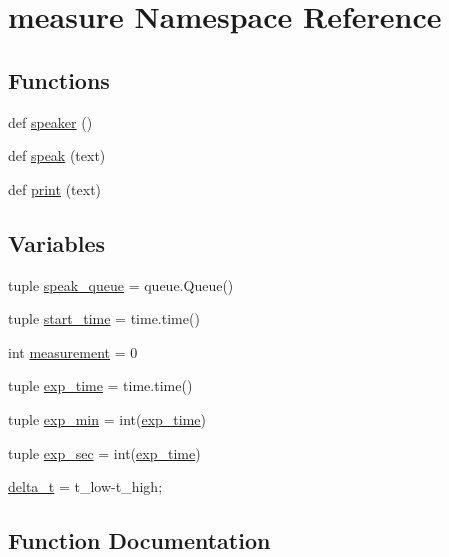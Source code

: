 \hypertarget{namespacemeasure}{}\section{measure Namespace Reference}
\label{namespacemeasure}
\subsection*{Functions}
\begin{DoxyCompactItemize}
\item 
def \hyperlink{namespacemeasure_a06a8470d68cd473205f1104a8a92b900}{speaker} ()
\item 
def \hyperlink{namespacemeasure_aee10fcc5094bce5022e1c6d65d4d0a62}{speak} (text)
\item 
def \hyperlink{namespacemeasure_a82ecbc4d07f744db6ad6c674647cb75f}{print} (text)
\end{DoxyCompactItemize}
\subsection*{Variables}
\begin{DoxyCompactItemize}
\item 
tuple \hyperlink{namespacemeasure_af323a7d2fced20a22d77d5ca33a02deb}{speak\+\_\+queue} = queue.\+Queue()
\item 
tuple \hyperlink{namespacemeasure_a5b970496a746cc9ac6c6064be7f3a491}{start\+\_\+time} = time.\+time()
\item 
int \hyperlink{namespacemeasure_a5ce3f5c291ec743465bc3d544003963d}{measurement} = 0
\item 
tuple \hyperlink{namespacemeasure_aad1b89bf56c65c84d05ad5d6dde28ec1}{exp\+\_\+time} = time.\+time()
\item 
tuple \hyperlink{namespacemeasure_a96bb4b99a91ea6eb9daf66a467aa1c9e}{exp\+\_\+min} = int(\hyperlink{namespacemeasure_aad1b89bf56c65c84d05ad5d6dde28ec1}{exp\+\_\+time})
\item 
tuple \hyperlink{namespacemeasure_a869c2ef982e2772fbc71b949d26cf7d0}{exp\+\_\+sec} = int(\hyperlink{namespacemeasure_aad1b89bf56c65c84d05ad5d6dde28ec1}{exp\+\_\+time})
\item 
\hyperlink{namespacemeasure_af6458fcb07f8848e51d782c6275a3180}{delta\+\_\+t} = t\+\_\+low-\/t\+\_\+high;
\end{DoxyCompactItemize}


\subsection{Function Documentation}
\hypertarget{namespacemeasure_a82ecbc4d07f744db6ad6c674647cb75f}{}
